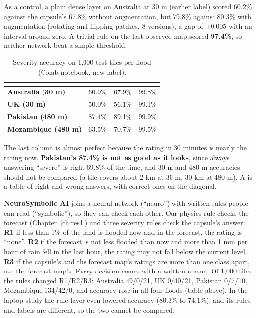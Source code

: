 As a control, a plain dense layer on Australia at 30 m (earlier label) scored 60.2\% against the capsule's 67.8\% without augmentation, but 79.8\% against 80.3\% with augmentation (rotating and flipping patches, 8 versions), a gap of $+0.005$ with an interval around zero. A trivial rule on the last observed map scored \textbf{97.4\%}, so neither network beat a simple threshold.

\begin{table}[!htbp]
\centering\small
\caption{Severity accuracy on 1,000 test tiles per flood (Colab notebook, new label).}\label{tab:caps}
\begin{tabularx}{\linewidth}{|>{\bfseries}p{3.6cm}|Y|Y|Y|}
\hline
{}  &  &  & \\ \hline
Australia (30 m) & 60.9\% & 67.9\% & 99.8\%\\ \hline
UK (30 m) & 50.0\% & 56.1\% & 99.1\%\\ \hline
Pakistan (480 m) & 87.4\% & 89.1\% & 99.9\%\\ \hline
Mozambique (480 m) & 63.5\% & 70.7\% & 99.5\%\\ \hline
\end{tabularx}
\end{table}

The last column is almost perfect because the rating in 30 minutes is nearly the rating now. \textbf{Pakistan's 87.4\% is not as good as it looks}, since always answering ``severe'' is right 69.8\% of the time, and 30 m and 480 m accuracies should not be compared (a tile covers about 2 km at 30 m, 30 km at 480 m). A  is a table of right and wrong answers, with correct ones on the diagonal.

\textbf{NeuroSymbolic AI} joins a neural network (``neuro'') with written rules people can read (``symbolic''), so they can check each other. Our physics rule checks the forecast (Chapter~\ref{ch:res1}) and three severity rules check the capsule's answer: \textbf{R1} if less than 1\% of the land is flooded now and in the forecast, the rating is ``none''. \textbf{R2} if the forecast is not less flooded than now and more than 1 mm per hour of rain fell in the last hour, the rating may not fall below the current level. \textbf{R3} if the capsule's and the forecast map's ratings are more than one class apart, use the forecast map's. Every decision comes with a written reason. Of 1,000 tiles the rules changed R1/R2/R3: Australia 49/0/21, UK 0/40/21, Pakistan 0/7/10, Mozambique 134/42/0, and accuracy rose in all four floods (table above). In the laptop study the rule layer even lowered accuracy (80.3\% to 74.1\%), and its rules and labels are different, so the two cannot be compared.

